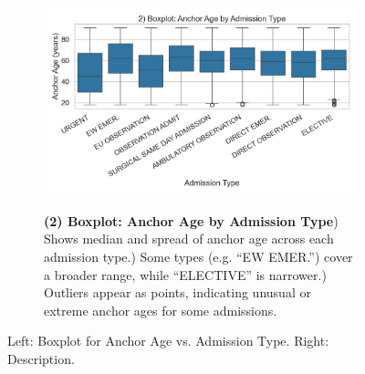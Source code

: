 \documentclass[12pt,a4paper]{report}
\begin{document}
\begin{figure}[ht!]
    \centering
    \begin{subfigure}{0.42\textwidth}
        \includegraphics[width=\linewidth]{mimic_plots/plot2.jpg}
    \end{subfigure}\hfill
    \begin{subfigure}{0.54\textwidth}
        \footnotesize
        \textbf{(2) Boxplot: Anchor Age by Admission Type}) Shows median and spread of anchor age across each admission type.) Some types (e.g. “EW EMER.”) cover a broader range, while “ELECTIVE” is narrower.) Outliers appear as points, indicating unusual or extreme anchor ages for some admissions.
    \end{subfigure}
    \caption{Left: Boxplot for Anchor Age vs. Admission Type. Right: Description.}
    \label{fig:plot2}
\end{figure}
\end{document}
